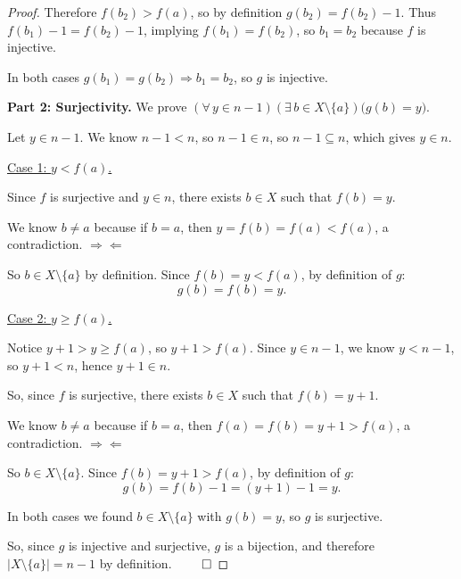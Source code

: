 \documentclass[11pt]{article}
\theoremstyle{defstyle}
\theoremstyle{thmstyle}
\theoremstyle{notstyle}
\begin{document}
\begin{thmbox}
\begin{proof}
Therefore $f(b_2) > f(a)$, so by definition $g(b_2) = f(b_2) - 1$.
Thus $f(b_1) - 1 = f(b_2) - 1$, implying $f(b_1) = f(b_2)$,
so $\boxed{b_1 = b_2}$ because $f$ is injective.

\medskip
In both cases $g(b_1) = g(b_2) \Rightarrow b_1 = b_2$, so $g$ is injective.

\medskip
\noindent\textbf{Part 2: Surjectivity.}
We prove $(\forall\, y \in n{-}1)(\exists\, b \in X \setminus \{a\})\bigl(g(b) = y\bigr)$.

Let $y \in n-1$.  We know $n-1 < n$, so $n-1 \in n$, so $n-1 \subseteq n$,
which gives $y \in n$.

\medskip
\noindent\underline{Case 1: $y < f(a)$.}

Since $f$ is surjective and $y \in n$, there exists $b \in X$ such that $f(b) = y$.

We know $b \neq a$ because if $b = a$, then $y = f(b) = f(a) < f(a)$, a
contradiction. $\Rightarrow\!\Leftarrow$

So $b \in X \setminus \{a\}$ by definition.
Since $f(b) = y < f(a)$, by definition of $g$:
\[
  g(b) = f(b) = y.
\]

\medskip
\noindent\underline{Case 2: $y \geq f(a)$.}

Notice $y + 1 > y \geq f(a)$, so $y + 1 > f(a)$.
Since $y \in n-1$, we know $y < n-1$, so $y+1 < n$, hence $y+1 \in n$.

So, since $f$ is surjective, there exists $b \in X$ such that $f(b) = y+1$.

We know $b \neq a$ because if $b = a$, then $f(a) = f(b) = y+1 > f(a)$, a
contradiction. $\Rightarrow\!\Leftarrow$

So $b \in X \setminus \{a\}$.
Since $f(b) = y+1 > f(a)$, by definition of $g$:
\[
  g(b) = f(b) - 1 = (y+1) - 1 = y.
\]

\medskip
In both cases we found $b \in X \setminus \{a\}$ with $g(b) = y$, so $g$ is
surjective.

\medskip
So, since $g$ is injective and surjective, $g$ is a bijection, and therefore
$|X \setminus \{a\}| = n - 1$ by definition. $\qed$
\end{proof}
\end{thmbox}
\end{document}
